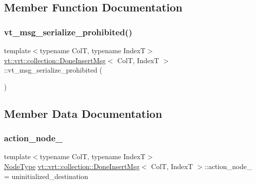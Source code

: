 \subsection{Member Function Documentation}
\mbox{\label{structvt_1_1vrt_1_1collection_1_1_done_insert_msg_af9c11a30581c60e18dfa0cee4841d793}} 
\subsubsection{\texorpdfstring{vt\+\_\+msg\+\_\+serialize\+\_\+prohibited()}{vt\_msg\_serialize\_prohibited()}}
{\footnotesize\ttfamily template$<$typename ColT, typename IndexT$>$ \\
\hyperlink{structvt_1_1vrt_1_1collection_1_1_done_insert_msg}{vt\+::vrt\+::collection\+::\+Done\+Insert\+Msg}$<$ ColT, IndexT $>$\+::vt\+\_\+msg\+\_\+serialize\+\_\+prohibited (\begin{DoxyParamCaption}{ }\end{DoxyParamCaption})}



\subsection{Member Data Documentation}
\mbox{\label{structvt_1_1vrt_1_1collection_1_1_done_insert_msg_a73c8173c2b8170bfd6be91491d79a0ae}} 
\subsubsection{\texorpdfstring{action\+\_\+node\+\_\+}{action\_node\_}}
{\footnotesize\ttfamily template$<$typename ColT, typename IndexT$>$ \\
\hyperlink{namespacevt_a866da9d0efc19c0a1ce79e9e492f47e2}{Node\+Type} \hyperlink{structvt_1_1vrt_1_1collection_1_1_done_insert_msg}{vt\+::vrt\+::collection\+::\+Done\+Insert\+Msg}$<$ ColT, IndexT $>$\+::action\+\_\+node\+\_\+ = uninitialized\+\_\+destination}

